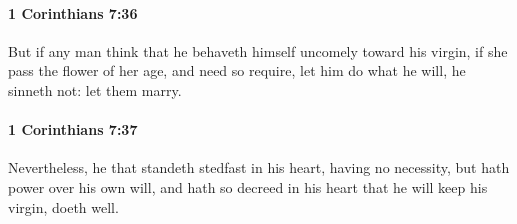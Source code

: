 		\paragraph{1 Corinthians 7:36} %
			\label{1CORINTHIANS-7-36}

			But if any man think that he behaveth himself uncomely toward his virgin, if she pass the flower of her age, and need so require, let him do what he will, he sinneth not: let them marry.

			\begin{framed}
			\scriptsize
				\begin{compactdesc}
					\item[SBLG] 
				\end{compactdesc}
			\end{framed}

		\paragraph{1 Corinthians 7:37} %
			\label{1CORINTHIANS-7-37}

			Nevertheless, he that standeth stedfast in his heart, having no necessity, but hath power over his own will, and hath so decreed in his heart that he will keep his virgin, doeth well.

